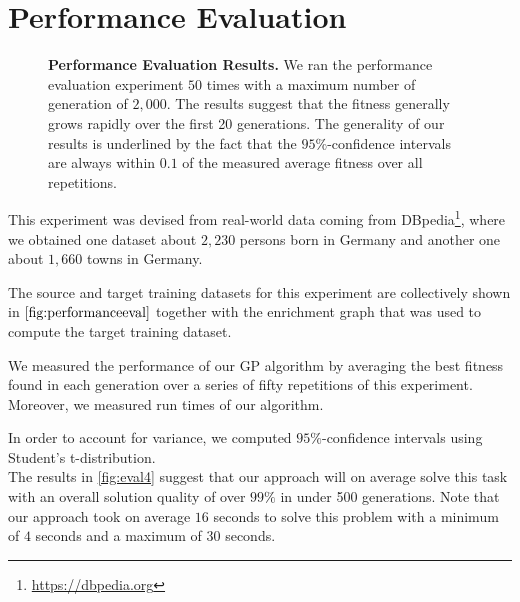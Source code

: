 \section{Performance Evaluation}
\begin{figure}[!h]
\centering

\caption[Performance Evaluation Results]{\textbf{Performance Evaluation Results.} We ran the performance evaluation experiment $50$ times with a maximum number of generation of $2,000$. The results suggest that the fitness generally grows rapidly over the first 20 generations. The generality of our results is underlined by the fact that the $95\%$-confidence intervals are always within $0.1$ of the measured average fitness over all repetitions.}
\label{fig:eval4}  
\end{figure}
This experiment was devised from real-world data coming from DBpedia\footnote{\url{https://dbpedia.org}}, where we obtained one dataset about $2,230$ persons born in Germany and another one about $1,660$ towns in Germany.

The source and target training datasets for this experiment are collectively shown in $\autoref{fig:performanceeval}$ together with the enrichment graph that was used to compute the target training dataset.

We measured the performance of our \acf{GP} algorithm by averaging the best fitness found in each generation over a series of fifty repetitions of this experiment.
Moreover, we measured run times of our algorithm.

In order to account for variance, we computed $95\%$-confidence intervals using Student's t-distribution.\\

The results in \autoref{fig:eval4} suggest that our approach will on average solve this task with an overall solution quality of over $99\%$ in under 500 generations.
Note that our approach took on average $16$ seconds to solve this problem with a minimum of $4$ seconds and a maximum of $30$ seconds.





%
